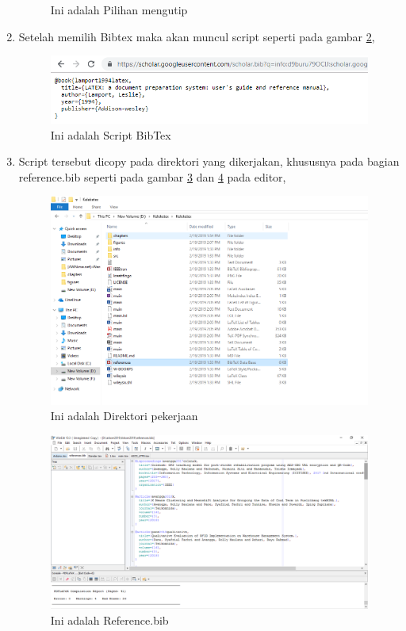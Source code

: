 \begin{enumerate}
\begin{figure}[!htbp]
  \caption{Ini adalah Pilihan mengutip}\label{fig:kutip}
\end{figure}
  \item Setelah memilih Bibtex maka akan muncul script seperti pada gambar \ref{fig:scriptbibtex},
  \begin{figure}[!htbp]
  \centering
  \includegraphics[width=.75\textwidth]{figures/scriptbibtex.png}
  \caption{Ini adalah Script BibTex}\label{fig:scriptbibtex}
\end{figure}
  \item Script tersebut dicopy pada direktori yang dikerjakan, khususnya pada bagian reference.bib seperti pada gambar \ref{fig:direktori} dan \ref{fig:reference} pada editor,
  \begin{figure}[!htbp]
  \centering
  \includegraphics[width=.75\textwidth]{figures/direktori.png}
  \caption{Ini adalah Direktori pekerjaan}\label{fig:direktori}
\end{figure}
\begin{figure}[!htbp]
  \centering
  \includegraphics[width=.75\textwidth]{figures/reference.png}
  \caption{Ini adalah Reference.bib}\label{fig:reference}

\end{figure}
\end{enumerate}
